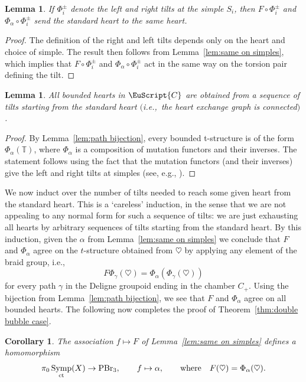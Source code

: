 \documentclass[pdftex]{sigma}
\newcommand{\scrC}{\EuScript{C}}
\DeclareMathOperator{\Symp}{Symp}
\def\bT{\mathbb{T}}
\newtheorem{lem}[thm]{Lemma}
\newtheorem{cor}[thm]{Corollary}
\theoremstyle{definition}
\numberwithin{equation}{section}
\begin{document}
\begin{lem}
If $\Phi_i^{\pm}$ denote the left and right tilts at the simple $S_i$, then $F \circ \Phi_i^{\pm}$ and $\Phi_{\alpha} \circ \Phi_i^{\pm}$ send the standard heart to the same heart.
\end{lem}

\begin{proof}
The definition of the right and left tilts depends only on the heart and choice of simple. The result then follows from Lemma~\ref{lem:same on simples}, which implies that $F \circ \Phi_i^{\pm}$ and $\Phi_{\alpha} \circ \Phi_i^{\pm}$ act in the same way on the torsion pair defining the tilt.
\end{proof}

\begin{lem}
All bounded hearts in $\scrC$ are obtained from a sequence of tilts starting from the standard heart $($i.e.,~the heart exchange graph is connected$)$.
\end{lem}

\begin{proof}
By Lemma~\ref{lem:path bijection}, every bounded t-structure is of the form $\Phi_{\alpha}(\bT)$, where $\Phi_{\alpha}$ is a composition of mutation functors and their inverses. The statement follows using the fact that the mutation functors (and their inverses) give the left and right tilts at simples (see, e.g., \cite[Lemma~5.5]{Hirano-Wemyss}).
\end{proof}

We now induct over the number of tilts needed to reach some given heart from the standard heart. This is a `careless' induction, in the sense that we are not appealing to any normal form for such a sequence of tilts: we are just exhausting all hearts by arbitrary sequences of tilts starting from the standard heart. By this induction, given the $\alpha$ from Lemma~\ref{lem:same on simples} we conclude that $F$ and $\Phi_{\alpha}$ agree on the $t$-structure obtained from $\heartsuit$ by applying any element of the braid group, i.e.,
\[
F \Phi_{\gamma}(\heartsuit) = \Phi_{\alpha}(\Phi_{\gamma}(\heartsuit))
\]
for every path $\gamma$ in the Deligne groupoid ending in the chamber $C_+$. Using the bijection from Lemma~\ref{lem:path bijection}, we see that $F$ and $\Phi_{\alpha}$ agree on all bounded hearts. The following now completes the proof of Theorem~\ref{thm:double bubble case}.

 \begin{cor}
 The association $f \mapsto F$ of Lemma~{\rm \ref{lem:same on simples}} defines a homomorphism
 \[
 \pi_0\Symp_{\rm ct}(X) \to {\rm PBr}_3, \qquad f \mapsto \alpha, \qquad \mathrm{where} \quad F(\heartsuit) = \Phi_{\alpha}(\heartsuit).
 \]
 \end{cor}
\end{document}
